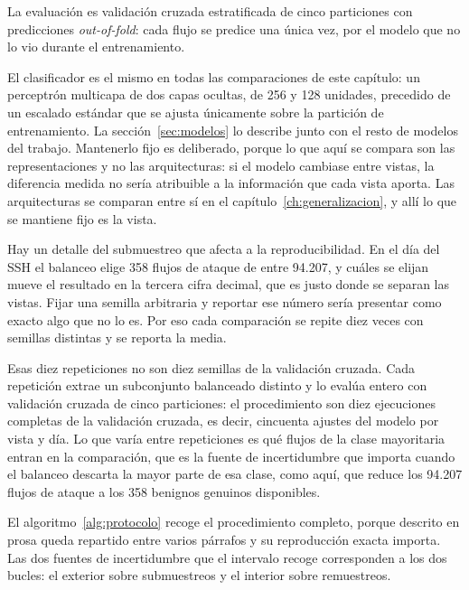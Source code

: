 La evaluación es validación cruzada estratificada de cinco particiones con
predicciones \emph{out-of-fold}: cada flujo se predice una única vez, por el
modelo que no lo vio durante el entrenamiento.

El clasificador es el mismo en todas las comparaciones de este capítulo: un
perceptrón multicapa de dos capas ocultas, de 256 y 128 unidades, precedido de
un escalado estándar que se ajusta únicamente sobre la partición de
entrenamiento. La sección~\ref{sec:modelos} lo describe junto con el resto de
modelos del trabajo. Mantenerlo fijo es deliberado, porque lo que aquí se
compara son las representaciones y no las arquitecturas: si el modelo cambiase
entre vistas, la diferencia medida no sería atribuible a la información que cada
vista aporta. Las arquitecturas se comparan entre sí en el
capítulo~\ref{ch:generalizacion}, y allí lo que se mantiene fijo es la vista.

Hay un detalle del submuestreo que afecta a la
reproducibilidad. En el día del SSH el balanceo elige 358 flujos de ataque de
entre 94.207, y cuáles se elijan mueve el resultado en la tercera cifra decimal,
que es justo donde se separan las vistas. Fijar una semilla arbitraria y
reportar ese número sería presentar como exacto algo que no lo es. Por eso cada
comparación se repite diez veces con semillas distintas y se reporta la media.

Esas diez repeticiones no son diez
semillas de la validación cruzada. Cada repetición extrae un subconjunto
balanceado distinto y lo evalúa entero con validación cruzada de cinco
particiones: el procedimiento son diez ejecuciones completas de la
validación cruzada, es decir, cincuenta ajustes del modelo por vista y día. Lo
que varía entre repeticiones es qué flujos de la clase mayoritaria entran en la
comparación, que es la fuente de incertidumbre que importa cuando el balanceo
descarta la mayor parte de esa clase, como aquí, que reduce los 94.207 flujos de
ataque a los 358 benignos genuinos disponibles.

El algoritmo~\ref{alg:protocolo} recoge el procedimiento completo, porque
descrito en prosa queda repartido entre varios párrafos y su reproducción exacta
importa. Las dos fuentes de incertidumbre que el intervalo recoge corresponden a
los dos bucles: el exterior sobre submuestreos y el interior sobre remuestreos.

